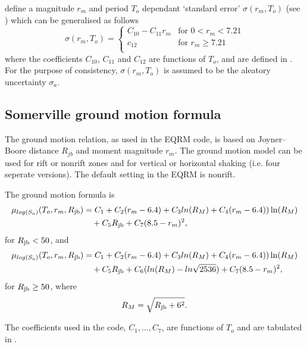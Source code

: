 \cite{dr_Sadigh97a} define a magnitude $r_m$ and period $T_o$
dependant `standard error' $\sigma(r_m,T_o)$ (see \citealt[Table
3]{dr_Sadigh97a}) which can be generalised as follows
\begin{equation}
\sigma(r_m,T_o) = \left \{ \begin{array}{ll}
C_{10}-C_{11}r_m & \textrm{for $0<r_m<7.21$} \\
c_{12} & \textrm{for $r_m \geq 7.21$} \\
\end{array} \right.
\end{equation}
where the coefficients $C_{10}$, $C_{11}$ and $C_{12}$ are
functions of $T_o$, and are defined in \cite[Table
A-14]{dr_Campbell03a}. For the purpose of
consistency, $\sigma(r_m,T_o)$ is assumed to be the aleatory
uncertainty $\sigma_a$.


\subsection{Somerville ground motion formula}
The \citet{dr_Somerville01a} ground motion relation, as used in the
EQRM code, is based on Joyner--Boore distance $R_{jb}$ and moment
magnitude $r_m$. The \citet{dr_Somerville01a} ground motion model
can be used for rift or nonrift zones and for vertical or
horizontal shaking (i.e. four seperate versions). The default
setting in the EQRM is nonrift.



The ground motion formula is
\begin{equation}
\begin{split}
\mu_{log(S_a)}(T_o,r_m,\Rjb) &= C_1 + C_2(r_m-6.4) + C_3ln(R_M) + C_4(r_m-6.4))\ln(R_M) \\
       &\quad  + C_5 \Rjb+ C_7(8.5-r_m)^2,
\end{split}
\end{equation}
for $\Rjb<50$, and
\begin{equation}
\begin{split}
\mu_{log(S_a)}(T_o,r_m,\Rjb) &= C_1 + C_2(r_m-6.4) + C_3ln(R_M) + C_4(r_m-6.4))\ln(R_M) \\
       &\quad  + C_5 \Rjb + C_6(ln(R_M)-ln\sqrt{2536}) +    C_7(8.5-r_m)^2,
\end{split}
\end{equation}
for $\Rjb \geq 50$, where
\begin{equation}
 R_M = \sqrt{ \Rjb + 6^2 }.
\end{equation}

The coefficients used in the code, $C_1,\ldots,C_7$, are functions
of $T_o$ and are tabulated in \citet[Table 9]{dr_Somerville01a}.


